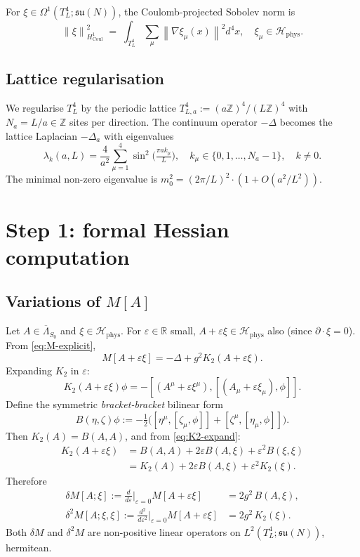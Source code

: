 \documentclass[11pt,a4paper]{amsart}
\theoremstyle{definition}
\newcommand{\R}{\mathbb{R}}
\newcommand{\Z}{\mathbb{Z}}
\newcommand{\su}{\mathfrak{su}}
\newcommand{\norm}[1]{\left\lVert#1\right\rVert}
\newcommand{\Coul}{\mathrm{Coul}}
\begin{document}
For $\xi \in \Omega^1(T^4_L; \su(N))$, the Coulomb-projected Sobolev norm is
\[
\norm{\xi}_{H^1_{\Coul}}^2 \;=\; \int_{T^4_L} \sum_\mu \norm{\nabla \xi_\mu(x)}^2 d^4 x,
\quad \xi_\mu \in \mathcal H_{\mathrm{phys}}.
\]

\subsection{Lattice regularisation}\label{ssec:lattice}

We regularise $T^4_L$ by the periodic lattice $T^4_{L,a} := (a\Z)^4 / (L\Z)^4$
with $N_a = L/a \in \Z$ sites per direction. The continuum operator $-\Delta$
becomes the lattice Laplacian $-\Delta_a$ with eigenvalues
\[
\lambda_k(a, L) = \frac{4}{a^2}\sum_{\mu=1}^4 \sin^2\bigl(\tfrac{\pi a k_\mu}{L}\bigr),
\quad k_\mu \in \{0, 1, \ldots, N_a-1\}, \quad k \neq 0.
\]
The minimal non-zero eigenvalue is $m_0^2 = (2\pi/L)^2 \cdot (1 + O(a^2/L^2))$.

\section{Step 1: formal Hessian computation}\label{sec:formal}

\subsection{Variations of $M[A]$}

Let $A \in \overline\Lambda_{S_0}$ and $\xi \in \mathcal H_{\mathrm{phys}}$.
For $\varepsilon \in \R$ small, $A + \varepsilon \xi \in \mathcal H_{\mathrm{phys}}$ also
(since $\partial \cdot \xi = 0$). From \eqref{eq:M-explicit},
\begin{equation}\label{eq:M-A-xi}
M[A + \varepsilon \xi] = -\Delta + g^2 K_2(A + \varepsilon \xi).
\end{equation}
Expanding $K_2$ in $\varepsilon$:
\begin{equation}\label{eq:K2-expand}
K_2(A + \varepsilon\xi)\phi = -[(A^\mu + \varepsilon \xi^\mu), [(A_\mu + \varepsilon \xi_\mu), \phi]].
\end{equation}
Define the symmetric \emph{bracket-bracket} bilinear form
\[
B(\eta, \zeta)\phi := -\tfrac{1}{2}\bigl([\eta^\mu, [\zeta_\mu, \phi]] + [\zeta^\mu, [\eta_\mu, \phi]]\bigr).
\]
Then $K_2(A) = B(A, A)$, and from \eqref{eq:K2-expand}:
\begin{align*}
K_2(A + \varepsilon \xi) &= B(A,A) + 2\varepsilon B(A, \xi) + \varepsilon^2 B(\xi, \xi) \\
&= K_2(A) + 2\varepsilon B(A, \xi) + \varepsilon^2 K_2(\xi).
\end{align*}
Therefore
\begin{align}\label{eq:dM}
\delta M[A; \xi] := \frac{d}{d\varepsilon}\Big|_{\varepsilon=0} M[A + \varepsilon \xi]
&= 2 g^2 \, B(A, \xi), \\
\label{eq:d2M}
\delta^2 M[A; \xi, \xi] := \frac{d^2}{d\varepsilon^2}\Big|_{\varepsilon=0} M[A + \varepsilon \xi]
&= 2 g^2 \, K_2(\xi).
\end{align}
Both $\delta M$ and $\delta^2 M$ are non-positive linear operators on
$L^2(T^4_L; \su(N))$, hermitean.
\end{document}
